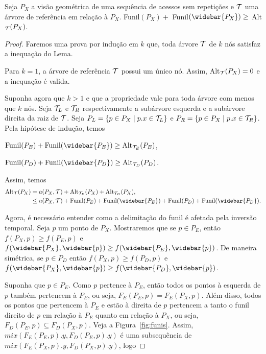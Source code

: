 \begin{lemma} \label{lemma:relacao-alt-com-funil}
    Seja $P_X$ a visão geométrica de uma sequência de acessos sem repetições e $\mathcal{T}$ uma árvore de referência em relação à $P_X$. Funil$(P_X) + $ Funil$(\widebar{P_X}) \geq $ Alt$_{\mathcal{T}}(P_X)$.
\end{lemma}

\begin{proof}
    Faremos uma prova por indução em $k$ que, toda árvore $\mathcal{T}$ de $k$ nós satisfaz a inequação do Lema.

    Para $k = 1$, a árvore de referência $\mathcal{T}$ possui um único nó. Assim, Alt$_{\mathcal{T}}(P_X) = 0$ e a inequação é valida.

    Suponha agora que $k > 1$ e que a propriedade vale para toda árvore com menos que $k$ nós. Seja $\mathcal{T}_{L}$ e $\mathcal{T}_{R}$ respectivamente a subárvore esquerda e a subárvore direita da raiz de $\mathcal{T}$. Seja $P_L = \{p \in P_X \mid p.x \in \mathcal{T}_L\}$ e $P_R = \{p \in P_X \mid p.x \in \mathcal{T}_R\}$. Pela hipótese de indução, temos
    \begin{center}
    $\text{Funil}(P_E) +  \text{Funil}(\widebar{P_E}) \geq  \text{Alt}_{\cT_E}(P_E)$,

    $\text{Funil}(P_D) +  \text{Funil}(\widebar{P_D}) \geq  \text{Alt}_{\cT_D}(P_D)$.
    \end{center}
    Assim, temos 
    \begin{align}
        \text{Alt}_{\cT}(P_X) &= a(P_X,\cT) + \text{Alt}_{\cT_E}(P_X) + \text{Alt}_{\cT_D}(P_X), \notag \\
        &\leq a(P_X,\cT) + \text{Funil}(P_E) +  \text{Funil}(\widebar{P_E}) + \text{Funil}(P_D) +  \text{Funil}(\widebar{P_D}). \label{eq:inicio}
    \end{align}

    Agora, é necessário entender como a delimitação do funil é afetada pela inversão temporal.
    Seja $p$ um ponto de $P_X$. Mostraremos que se $p \in P_E$, então $f(P_X,p) \geq f(P_E,p)$ e $f(\widebar{P_X},\widebar{p}) \geq f(\widebar{P_E},\widebar{p})$. De maneira simétrica, se $p \in P_D$ então $f(P_X,p) \geq f(P_D,p)$ e $f(\widebar{P_X},\widebar{p}) \geq f(\widebar{P_D},\widebar{p})$.

    Suponha que $p \in P_E$. Como $p$ pertence à $P_E$, então todos os pontos à esquerda de $p$ também pertencem à $P_E$, ou seja, $F_E(P_E,p) = F_E(P_X,p)$. Além disso, todos os pontos que pertencem à $P_E$ e estão à direita de $p$ pertencem a tanto o funil direito de $p$ em relação à $P_E$ quanto em relação à $P_X$, ou seja, $F_D(P_E,p) \subseteq F_D(P_X,p)$. Veja a Figura~\ref{fig:funis}. Assim, $mix(F_E(P_E,p).y,F_D(P_E,p).y)$ é uma subsequência de $mix(F_E(P_X,p).y,F_D(P_X,p).y)$, logo 


\end{proof}
